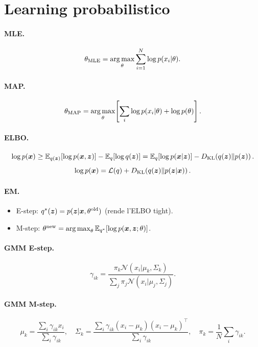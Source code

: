 \section{Learning probabilistico}

\paragraph{MLE.}
\[
\theta_{\text{MLE}} = \operatorname*{arg\,max}_\theta \sum_{i=1}^N \log p(x_i|\theta).
\]

\paragraph{MAP.}
\[
\theta_{\text{MAP}} = \operatorname*{arg\,max}_\theta \!\left[\sum_i \log p(x_i|\theta) + \log p(\theta)\right].
\]

\paragraph{ELBO.}
\[
\log p(\bm{x}) \geq \mathbb{E}_{q(\bm{z})}[\log p(\bm{x},\bm{z})] - \mathbb{E}_{q}[\log q(\bm{z})] = \mathbb{E}_q[\log p(\bm{x}|\bm{z})] - D_{\mathrm{KL}}\!\left(q(\bm{z}) \| p(\bm{z})\right).
\]
\[
\log p(\bm{x}) = \mathcal{L}(q) + D_{\mathrm{KL}}\!\left(q(\bm{z}) \| p(\bm{z}|\bm{x})\right).
\]

\paragraph{EM.}
\begin{itemize}
  \item E-step: $q^*(\bm{z}) = p(\bm{z}|\bm{x}, \theta^{\text{old}})$ (rende l'ELBO tight).
  \item M-step: $\theta^{\text{new}} = \operatorname*{arg\,max}_\theta \mathbb{E}_{q^*}[\log p(\bm{x},\bm{z};\theta)]$.
\end{itemize}

\paragraph{GMM E-step.}
\[
\gamma_{ik} = \frac{\pi_k \mathcal{N}(x_i|\mu_k,\Sigma_k)}{\sum_j \pi_j \mathcal{N}(x_i|\mu_j,\Sigma_j)}.
\]

\paragraph{GMM M-step.}
\[
\mu_k = \frac{\sum_i \gamma_{ik} x_i}{\sum_i \gamma_{ik}},\quad
\Sigma_k = \frac{\sum_i \gamma_{ik} (x_i-\mu_k)(x_i-\mu_k)^\top}{\sum_i \gamma_{ik}},\quad
\pi_k = \frac{1}{N}\sum_i \gamma_{ik}.
\]

